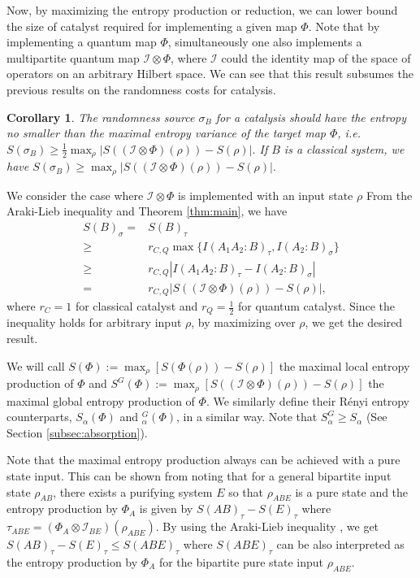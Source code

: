 \documentclass[aps, reprint, amsmath,amssymb, prx, superscriptaddress]{revtex4-2}
\newtheorem{corollary}[theorem]{Corollary}
\begin{document}
Now, by maximizing the entropy production or reduction, we can lower bound the size of catalyst required for implementing a given map $\Phi$. Note that by implementing a quantum map $\Phi$, simultaneously one also implements a multipartite quantum map $\mathcal{I} \otimes \Phi$, where $\mathcal{I}$ could the identity map of the space of operators on an arbitrary Hilbert space. We can see that this result subsumes the previous results on the randomness costs for catalysis.

\begin{corollary} \label{coro:cost}
    The randomness source $\sigma_B$ for a catalysis should have the entropy no smaller than the maximal entropy variance of the target map $\Phi$, i.e. $S(\sigma_B)\geq \frac{1}{2} \max_\rho |S((\mathcal{I}\otimes \Phi)(\rho))-S(\rho)|.$ If $B$ is a classical system, we have $S(\sigma_B)\geq \max_\rho |S((\mathcal{I}\otimes \Phi)(\rho))-S(\rho)|.$
\end{corollary}

\begin{proofEnd}
    We consider the case where $\mathcal{I}\otimes \Phi$ is implemented with an input state $\rho$ From the Araki-Lieb inequality \cite{araki1970entropy} and Theorem \ref{thm:main}, we have 
    \begin{align*}
        S(B)_\sigma =& S(B)_\tau\\
        \geq& r_{C,Q} \max\{ I(A_1A_2:B)_\tau ,I(A_2:B)_\sigma \} \\
        \geq& r_{C,Q} |I(A_1A_2:B)_\tau - I(A_2:B)_\sigma|\\
        =& r_{C,Q} |S((\mathcal{I}\otimes \Phi)(\rho))-S(\rho)|,
    \end{align*}
     where $r_{C}=1$ for classical catalyst and $r_Q=\frac{1}{2}$ for quantum catalyst. Since the inequality holds for arbitrary input $\rho$, by maximizing over $\rho$, we get the desired result. 
\end{proofEnd}
    We will call $S(\Phi):=\max_\rho \left[S(\Phi(\rho))-S(\rho)\right]$ the maximal local entropy production of $\Phi$ and $S^G(\Phi):=\max_\rho \left[S((\mathcal{I}\otimes\Phi)(\rho))-S(\rho)\right]$ the maximal global entropy production of $\Phi$. We similarly define their R\'{e}nyi entropy counterparts, $S_\alpha(\Phi)$ and $_\alpha^G(\Phi)$, in a similar way. Note that $S_\alpha^G\geq S_\alpha$ (See Section \ref{subsec:absorption}).
    
    Note that the maximal entropy production always can be achieved with a pure state input. This can be shown from noting that for a general bipartite input state $\rho_{AB}$, there exists a purifying system $E$ so that $\rho_{ABE}$ is a pure state and the entropy production by $\Phi_A$ is given by $S(AB)_\tau-S(E)_\tau$ where $\tau_{ABE}=(\Phi_A \otimes \mathcal{I}_{BE})(\rho_{ABE})$. By using the Araki-Lieb inequality \cite{araki1970entropy}, we get $S(AB)_\tau-S(E)_\tau \leq S(ABE)_\tau$ where $S(ABE)_\tau$ can be also interpreted as the entropy production by $\Phi_A$ for the bipartite pure state input $\rho_{ABE}$.
    
\end{document}
